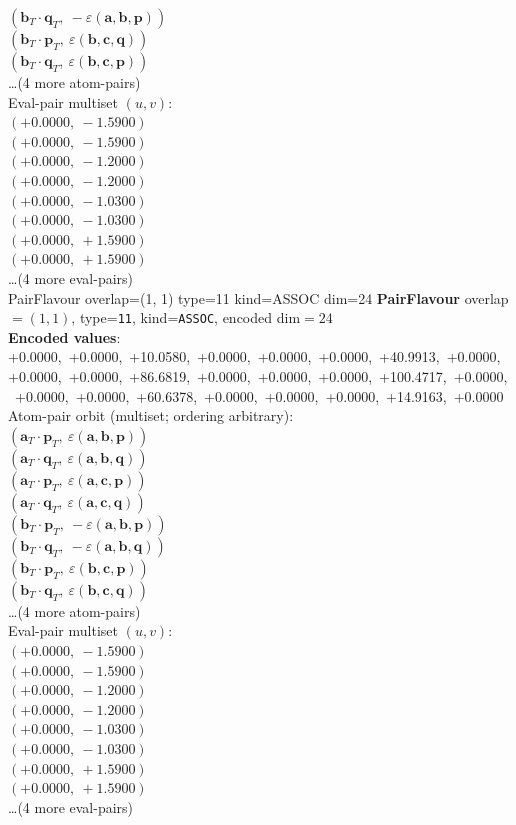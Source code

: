 \documentclass[a4paper,11pt]{article}
\newcommand{\fpbeomcfokjooi}[2]{\mathbf{#1}_T \cdot \mathbf{#2}_T}
\newcommand{\kblbmcpggoncpf}[3]{\varepsilon(\mathbf{#1},\mathbf{#2},\mathbf{#3})}
\begin{document}
$(\fpbeomcfokjooi{b}{q},\ -\kblbmcpggoncpf{a}{b}{p})$\\
$(\fpbeomcfokjooi{b}{p},\ \kblbmcpggoncpf{b}{c}{q})$\\
$(\fpbeomcfokjooi{b}{q},\ \kblbmcpggoncpf{b}{c}{p})$\\
\quad \ldots (4 more atom-pairs)\\
\quad Eval-pair multiset $(u, v)$:\\
$(+0.0000,\ -1.5900)$\\
$(+0.0000,\ -1.5900)$\\
$(+0.0000,\ -1.2000)$\\
$(+0.0000,\ -1.2000)$\\
$(+0.0000,\ -1.0300)$\\
$(+0.0000,\ -1.0300)$\\
$(+0.0000,\ +1.5900)$\\
$(+0.0000,\ +1.5900)$\\
\quad \ldots (4 more eval-pairs)\\
    PairFlavour  overlap=(1, 1)  type=11  kind=ASSOC  dim=24
\textbf{PairFlavour} overlap$=(1, 1)$, type=\texttt{11}, kind=\texttt{ASSOC}, encoded dim$=24$\\
\textbf{      Encoded values}: +0.0000,\ +0.0000,\ +10.0580,\ +0.0000,\ +0.0000,\ +0.0000,\ +40.9913,\ +0.0000,\ +0.0000,\ +0.0000,\ +86.6819,\ +0.0000,\ +0.0000,\ +0.0000,\ +100.4717,\ +0.0000,\ +0.0000,\ +0.0000,\ +60.6378,\ +0.0000,\ +0.0000,\ +0.0000,\ +14.9163,\ +0.0000\\
\quad Atom-pair orbit (multiset; ordering arbitrary):\\
$(\fpbeomcfokjooi{a}{p},\ \kblbmcpggoncpf{a}{b}{p})$\\
$(\fpbeomcfokjooi{a}{q},\ \kblbmcpggoncpf{a}{b}{q})$\\
$(\fpbeomcfokjooi{a}{p},\ \kblbmcpggoncpf{a}{c}{p})$\\
$(\fpbeomcfokjooi{a}{q},\ \kblbmcpggoncpf{a}{c}{q})$\\
$(\fpbeomcfokjooi{b}{p},\ -\kblbmcpggoncpf{a}{b}{p})$\\
$(\fpbeomcfokjooi{b}{q},\ -\kblbmcpggoncpf{a}{b}{q})$\\
$(\fpbeomcfokjooi{b}{p},\ \kblbmcpggoncpf{b}{c}{p})$\\
$(\fpbeomcfokjooi{b}{q},\ \kblbmcpggoncpf{b}{c}{q})$\\
\quad \ldots (4 more atom-pairs)\\
\quad Eval-pair multiset $(u, v)$:\\
$(+0.0000,\ -1.5900)$\\
$(+0.0000,\ -1.5900)$\\
$(+0.0000,\ -1.2000)$\\
$(+0.0000,\ -1.2000)$\\
$(+0.0000,\ -1.0300)$\\
$(+0.0000,\ -1.0300)$\\
$(+0.0000,\ +1.5900)$\\
$(+0.0000,\ +1.5900)$\\
\quad \ldots (4 more eval-pairs)\\
\end{document}
